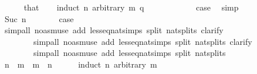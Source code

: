 \begin{isabellebody}
\ \ \ \ \isamarkupfalse%
\ that\isanewline
\ \ \isamarkupfalse%
\ {\isacharparenleft}{\kern0pt}induct\ n\ arbitrary{\isacharcolon}{\kern0pt}\ m\ q{\isacharparenright}{\kern0pt}\isanewline
\ \ \ \ \isamarkupfalse%
\ {}\isanewline
\ \ \ \ \isamarkupfalse%
\ {\isacharquery}{\kern0pt}case\ \isamarkupfalse%
\ simp\isanewline
\ \ \isamarkupfalse%
\isanewline
\ \ \ \ \isamarkupfalse%
\ {\isacharparenleft}{\kern0pt}Suc\ n{\isacharparenright}{\kern0pt}\isanewline
\ \ \ \ \isamarkupfalse%
\ \isamarkupfalse%
\ {\isacharquery}{\kern0pt}case\isanewline
\ \ \ \ \ \ \isamarkupfalse%
\ {\isacharparenleft}{\kern0pt}simp{\isacharunderscore}{\kern0pt}all\ {\isacharparenleft}{\kern0pt}no{\isacharunderscore}{\kern0pt}asm{\isacharunderscore}{\kern0pt}use{\isacharparenright}{\kern0pt}\ add{\isacharcolon}{\kern0pt}\ less{\isacharunderscore}{\kern0pt}eq{\isacharunderscore}{\kern0pt}nat{\isachardot}{\kern0pt}simps{\isacharparenleft}{\kern0pt}{}{\isacharparenright}{\kern0pt}\ split{\isacharcolon}{\kern0pt}\ nat{\isachardot}{\kern0pt}splits{\isacharcomma}{\kern0pt}\ clarify{\isacharcomma}{\kern0pt}\isanewline
\ \ \ \ \ \ \ \ simp{\isacharunderscore}{\kern0pt}all\ {\isacharparenleft}{\kern0pt}no{\isacharunderscore}{\kern0pt}asm{\isacharunderscore}{\kern0pt}use{\isacharparenright}{\kern0pt}\ add{\isacharcolon}{\kern0pt}\ less{\isacharunderscore}{\kern0pt}eq{\isacharunderscore}{\kern0pt}nat{\isachardot}{\kern0pt}simps{\isacharparenleft}{\kern0pt}{}{\isacharparenright}{\kern0pt}\ split{\isacharcolon}{\kern0pt}\ nat{\isachardot}{\kern0pt}splits{\isacharcomma}{\kern0pt}\ clarify{\isacharcomma}{\kern0pt}\isanewline
\ \ \ \ \ \ \ \ simp{\isacharunderscore}{\kern0pt}all\ {\isacharparenleft}{\kern0pt}no{\isacharunderscore}{\kern0pt}asm{\isacharunderscore}{\kern0pt}use{\isacharparenright}{\kern0pt}\ add{\isacharcolon}{\kern0pt}\ less{\isacharunderscore}{\kern0pt}eq{\isacharunderscore}{\kern0pt}nat{\isachardot}{\kern0pt}simps{\isacharparenleft}{\kern0pt}{}{\isacharparenright}{\kern0pt}\ split{\isacharcolon}{\kern0pt}\ nat{\isachardot}{\kern0pt}splits{\isacharparenright}{\kern0pt}\isanewline
\ \ \isamarkupfalse%
\isanewline
\ \ \isamarkupfalse%
\ {\isachardoublequoteopen}n\ {\isasymle}\ m\ {\isasymor}\ m\ {\isasymle}\ n{\isachardoublequoteclose}\isanewline
\ \ \ \ \isamarkupfalse%
\ {\isacharparenleft}{\kern0pt}induct\ n\ arbitrary{\isacharcolon}{\kern0pt}\ m{\isacharparenright}{\kern0pt}\isanewline

\end{isabellebody}
